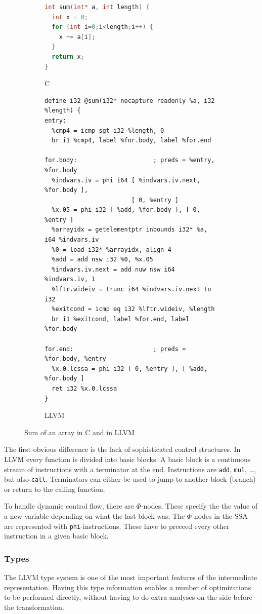 \documentclass[a4paper,bibliography=totocnumbered,parskip,headsepline]{scrbook}
\begin{document}
\begin{figure}[H]
\begin{subfigure}{\textwidth}
\begin{lstlisting}[language=C]
int sum(int* a, int length) {
  int x = 0;
  for (int i=0;i<length;i++) {
    x += a[i];
  }
  return x;
}
\end{lstlisting}
\caption{C}
\label{fig:sumc}
\end{subfigure}

\begin{subfigure}{\textwidth}
\begin{lstlisting}
define i32 @sum(i32* nocapture readonly %a, i32 %length) {
entry:
  %cmp4 = icmp sgt i32 %length, 0
  br i1 %cmp4, label %for.body, label %for.end

for.body:                     ; preds = %entry, %for.body
  %indvars.iv = phi i64 [ %indvars.iv.next, %for.body ],
                        [ 0, %entry ]
  %x.05 = phi i32 [ %add, %for.body ], [ 0, %entry ]
  %arrayidx = getelementptr inbounds i32* %a, i64 %indvars.iv
  %0 = load i32* %arrayidx, align 4
  %add = add nsw i32 %0, %x.05
  %indvars.iv.next = add nuw nsw i64 %indvars.iv, 1
  %lftr.wideiv = trunc i64 %indvars.iv.next to i32
  %exitcond = icmp eq i32 %lftr.wideiv, %length
  br i1 %exitcond, label %for.end, label %for.body

for.end:                      ; preds = %for.body, %entry
  %x.0.lcssa = phi i32 [ 0, %entry ], [ %add, %for.body ]
  ret i32 %x.0.lcssa
}
\end{lstlisting}
\caption{LLVM}
\label{fig:sumll}
\end{subfigure}
\caption{Sum of an array in C and in LLVM}
\label{fig:sum}
\end{figure}

The first obvious difference is the lack of sophisticated control structures.
In LLVM every function is divided into basic blocks.
A basic block is a continuous stream of instructions with a terminator at the end.
Instructions are \lstinline!add!, \lstinline!mul!, \dots, but also \lstinline!call!.
Terminators can either be used to jump to another block (branch) or return to the calling function.

To handle dynamic control flow, there are $\Phi$-nodes.
These specify the the value of a new variable depending on what the last block was.
The $\Phi$-nodes in the SSA are represented with \lstinline{phi}-instructions.
These have to preceed every other instruction in a given basic block.

\subsubsection{Types}
The LLVM type system is one of the most important features of the intermediate representation.
Having this type information enables a number of optimizations to be performed directly, without having to do extra analyses on the side before the transformation.
\end{document}
